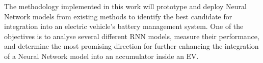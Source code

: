%
The methodology implemented in this work will prototype and deploy Neural Network models from existing methods to identify the best candidate for integration into an electric vehicle's battery management system.
One of the objectives is to analyse several different RNN models, measure their performance, and determine the most promising direction for further enhancing the integration of a Neural Network model into an accumulator inside an EV.
%

